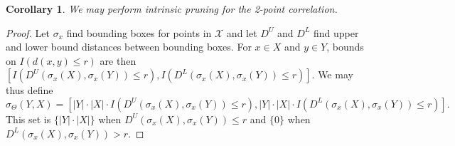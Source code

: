 \documentclass{article}
\newtheorem{corollary} {Corollary}
\newcommand{\GNP}[1][\psi]{{#1}_{\Theta}}
\begin{document}
\begin{corollary}
  We may perform intrinsic pruning for the 2-point correlation.
\end{corollary}
\begin{proof}
  Let $\sigma_x$ find bounding boxes for points in $\mathcal{X}$ and
  let $D^{\!U}$ and $D^{\!L}$ find upper and lower bound distances
  between bounding boxes.  For $x \in X$ and $y \in Y$, bounds on
  $I(d(x,y) \leq r)$ are then $\left[
  I(D^{\!U}(\sigma_x(X),\sigma_x(Y)) \leq r),
  I(D^{\!L}(\sigma_x(X),\sigma_x(Y)) \leq r) \right]$.  We may thus
  define
  \[
  \GNP[\sigma](Y,X) = \left[ |Y| \cdot |X| \cdot I(D^{\!U}(\sigma_x(X),\sigma_x(Y)) \leq r), |Y| \cdot |X| \cdot I(D^{\!L}(\sigma_x(X),\sigma_x(Y)) \leq r) \right].
  \]
  This set is $\{|Y| \cdot |X|\}$ when
  $D^{\!U}(\sigma_x(X),\sigma_x(Y)) \leq r$ and $\{0\}$ when
  $D^{\!L}(\sigma_x(X),\sigma_x(Y)) > r$.
\end{proof}

\end{document}
